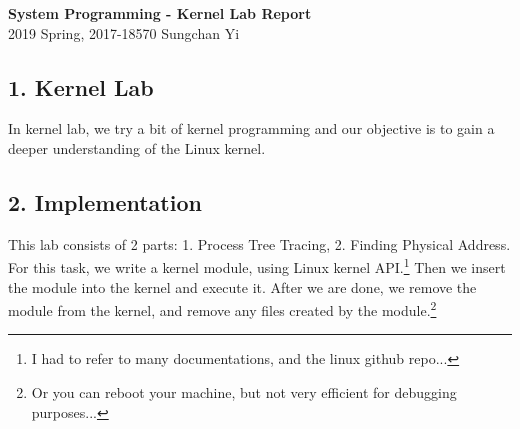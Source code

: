 \documentclass[12pt]{report}
\begin{document}
\begin{center}
\textbf{\Large System Programming - Kernel Lab Report}\\
\large 2019 Spring, 2017-18570 Sungchan Yi
\end{center}
\subsection*{1. Kernel Lab} In kernel lab, we try a bit of kernel programming and our objective is to gain a deeper understanding of the Linux kernel.
\subsection*{2. Implementation}
This lab consists of 2 parts: 1. Process Tree Tracing, 2. Finding Physical Address. For this task, we write a kernel module, using Linux kernel API.\footnote{I had to refer to many documentations, and the linux github repo...} Then we insert the module into the kernel and execute it. After we are done, we remove the module from the kernel, and remove any files created by the module.\footnote{Or you can reboot your machine, but not very efficient for debugging purposes...}
\end{document}
